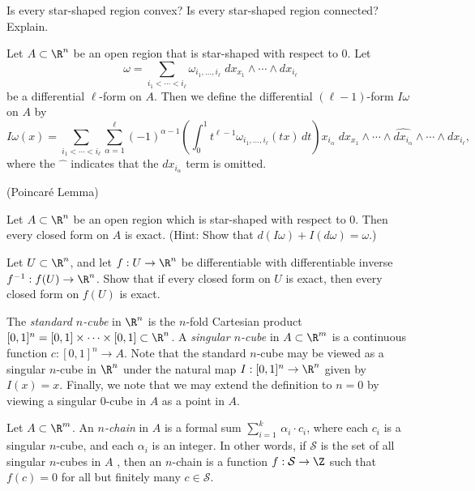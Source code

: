 \documentclass{book}
\begin{document}
\begin{exercise}
Is every star-shaped region convex?  Is every star-shaped region connected?  Explain.
\end{exercise}

\begin{definition}  Let $A\subset\R^n$ be an open region that is star-shaped with respect to 0.
Let
$$\omega=\sum_{i_1<\cdots <i_{\ell}}\omega_{i_1, \ldots, i_{\ell}}\;
dx_{x_1}\wedge\cdots\wedge dx_{i_{\ell}}$$
be a differential $\ell$-form on $A$.
Then we define the differential $(\ell -1)$-form $I\omega$ on $A$ by
$$I\omega (x) =\sum_{i_1<\cdots <i_{\ell}}\sum_{\alpha =1}^{\ell}(-1)^{\alpha -1}\left(\int_0^1
t^{\ell -1}\omega_{i_1, \ldots, i_{\ell}}(tx)\, dt\right)x_{i_{\alpha}}\;
dx_{x_1}\wedge\cdots\wedge\widehat{dx_{i_{\alpha}}}\wedge\cdots\wedge dx_{i_{\ell}},
$$  
where the $\widehat{\phantom{w}}$ indicates that the $dx_{i_{\alpha}}$ term is omitted.
\end{definition}

\begin{theorem}  (Poincar\'{e} Lemma)

Let $A\subset\R^n$ be an open region which is star-shaped with respect to 0.  Then every
closed form on $A$ is exact.
(Hint:  Show that $d(I\omega)+I(d\omega)=\omega$.)
\end{theorem}

\begin{exercise}
Let $U\subset\R^n$, and let $f:U\to\R^n$ be differentiable with differentiable inverse
$f^{-1}:f(U)\to\R^n$.  Show that if every closed form on $U$ is exact, then every closed form on $f(U)$ is exact.
\end{exercise}

\begin{definition}
The {\em standard $n$-cube} in $\R^n$ is the $n$-fold Cartesian product 
$[0,1]^n=[0,1]\times\cdots \times [0,1]\subset\R^n$.  A {\em singular $n$-cube} in $A\subset\R^m$
is a continuous function $c:[0,1]^n\to A$.  Note that the standard $n$-cube may be viewed as
a singular $n$-cube in $\R^n$ under the natural map $I:[0,1]^n\to\R^n$ given by $I(x)=x$.  
Finally, we note that we may extend the definition to $n=0$ by viewing a singular 0-cube in $A$
as a point in $A$.
\end{definition}

\begin{definition}
Let $A\subset\R^m$.
An {\em $n$-chain} in $A$ is a formal sum $\sum_{i=1}^k\, \alpha_i\cdot c_i$, where each 
$c_i$ is a singular $n$-cube, and each $\alpha_i$ is an integer.  In other words, if $\mathcal{S}$
is the set of all singular $n$-cubes in $A$ , then an $n$-chain is a function $f:\mathcal{S}\to\Z$ such 
that $f(c)=0$ for all but finitely many $c\in\mathcal{S}$.
\end{definition}
\end{document}
